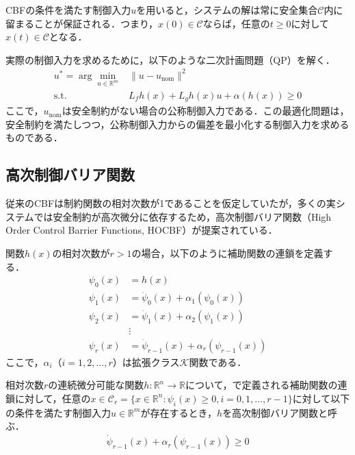 CBFの条件を満たす制御入力$u$を用いると，システムの解は常に安全集合$\mathcal{C}$内に留まることが保証される．つまり，$x(0) \in \mathcal{C}$ならば，任意の$t \geq 0$に対して$x(t) \in \mathcal{C}$となる．

実際の制御入力を求めるために，以下のような二次計画問題（QP）を解く．
\begin{equation}
\begin{aligned}
u^* = \arg\min_{u \in \mathbb{R}^m} & \|u - u_{\text{nom}}\|^2 \\
\text{s.t.} & L_f h(x) + L_g h(x)u + \alpha(h(x)) \geq 0
\label{eq:cbf_qp}
\end{aligned}
\end{equation}
ここで，$u_{\text{nom}}$は安全制約がない場合の公称制御入力である．この最適化問題は，安全制約を満たしつつ，公称制御入力からの偏差を最小化する制御入力を求めるものである．

\subsection{高次制御バリア関数}

従来のCBFは制約関数の相対次数が1であることを仮定していたが，多くの実システムでは安全制約が高次微分に依存するため，高次制御バリア関数（High Order Control Barrier Functions, HOCBF）が提案されている\cite{Xiao2022}．

関数$h(x)$の相対次数が$r > 1$の場合，以下のように補助関数の連鎖を定義する．
\begin{equation}
\begin{aligned}
\psi_0(x) &= h(x) \\
\psi_1(x) &= \dot{\psi}_0(x) + \alpha_1(\psi_0(x)) \\
\psi_2(x) &= \dot{\psi}_1(x) + \alpha_2(\psi_1(x)) \\
&\vdots \\
\psi_r(x) &= \dot{\psi}_{r-1}(x) + \alpha_r(\psi_{r-1}(x))
\label{eq:hocbf_chain}
\end{aligned}
\end{equation}
ここで，$\alpha_i$（$i = 1, 2, \ldots, r$）は拡張クラス$\mathcal{K}$関数である．

\begin{definition}[高次制御バリア関数]
相対次数$r$の連続微分可能な関数$h: \mathbb{R}^n \rightarrow \mathbb{R}$について，で定義される補助関数の連鎖に対して，任意の$x \in \mathcal{C}_r = \{x \in \mathbb{R}^n : \psi_i(x) \geq 0, i = 0, 1, \ldots, r-1\}$に対して以下の条件を満たす制御入力$u \in \mathbb{R}^m$が存在するとき，$h$を高次制御バリア関数と呼ぶ．
\begin{equation}
\begin{aligned}
\dot{\psi}_{r-1}(x) + \alpha_r(\psi_{r-1}(x)) \geq 0
\label{eq:hocbf_condition}
\end{aligned}
\end{equation}
\end{definition}

